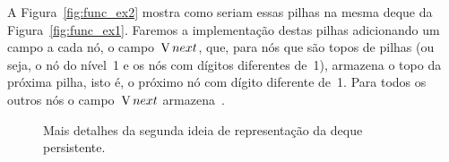 \documentclass[main.tex]{subfiles}
\begin{document}
A Figura~\ref{fig:func_ex2} mostra como seriam essas pilhas na mesma deque da Figura~\ref{fig:func_ex1}. Faremos a implementação destas pilhas adicionando um campo a cada nó, o campo~$\operatorname{V}{next}$, que, para nós que são topos de pilhas (ou seja, o nó do nível~1 e os nós com dígitos diferentes de~1), armazena o topo da próxima pilha, isto é, o próximo nó com dígito diferente de~1. Para todos os outros nós o campo~$\operatorname{V}{next}$ armazena~.

\begin{figure}
\centering
{}
\caption{Mais detalhes da segunda ideia de representação da deque persistente.} \label{fig:func_ex3}
\end{figure}
\end{document}
